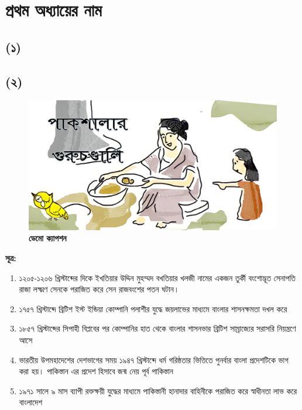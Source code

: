 \chapter*{প্রথম অধ্যায়ের নাম}

\section*{(১)}

\BanglaDummyText
\BanglaDummyText

\section*{(২)}

\BanglaDummyText
\begin{figure}
	\centering
	\includegraphics[width=\linewidth]{Images/DemoPic1.png}
	\caption{\small \textbf{ডেমো ক্যাপশন}}
\end{figure}

\BanglaDummyText
\begin{quotation}
	\textit{\BanglaDummyText}
\end{quotation}
\BanglaDummyText

\vskip 30pt
\scriptsize
	\textbf{সূত্র:}
	\begin{enumerate}%
		\item ১২০৫-১২০৬ খ্রিস্টাব্দের দিকে ইখতিয়ার উদ্দিন মুহম্মদ বখতিয়ার খলজী নামের একজন তুর্কী বংশোদ্ভূত সেনাপতি রাজা লক্ষ্মণ সেনকে পরাজিত করে সেন রাজবংশের পতন ঘটান।
		\item ১৭৫৭ খ্রিস্টাব্দে ব্রিটিশ ইস্ট ইন্ডিয়া কোম্পানি পলাশীর যুদ্ধে জয়লাভের মাধ্যমে বাংলার শাসনক্ষমতা দখল করে
		\item ১৮৫৭ খ্রিস্টাব্দের সিপাহী বিপ্লবের পর কোম্পানির হাত থেকে বাংলার শাসনভার ব্রিটিশ সাম্রাজ্যের সরাসরি নিয়ন্ত্রণে আসে
		\item ভারতীয় উপমহাদেশের দেশভাগের সময় ১৯৪৭ খ্রিস্টাব্দে ধর্ম গরিষ্ঠতার ভিত্তিতে পুনর্বার বাংলা প্রদেশটিকে ভাগ করা হয়। পাকিস্তান এর প্রদেশ হিসাবে জন্ম নেয় পূর্ব পাকিস্তান 
		\item ১৯৭১ সালে ৯ মাস ব্যাপী রক্তক্ষয়ী যুদ্ধের মাধ্যমে পাকিস্তানী হানাদার বাহিনীকে পরাজিত করে স্বাধীনতা লাভ করে বাংলাদেশ 
	\end{enumerate}
